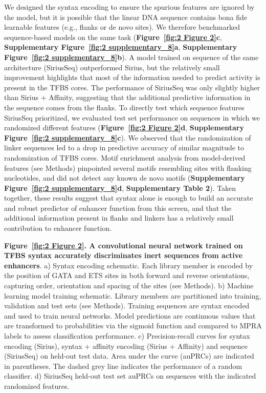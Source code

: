 We designed the syntax encoding to ensure the spurious features are ignored by the model, but it is possible that the linear DNA sequence contains bona fide learnable features (e.g., flanks or de novo sites). We therefore benchmarked sequence-based models on the same task (\textbf{Figure~\ref{fig:2 Figure 2}c}, \textbf{Supplementary Figure~\ref{fig:2 supplementary_8}a}, \textbf{Supplementary Figure~\ref{fig:2 supplementary_8}b})\cite{Ghandi2014-ql}. A model trained on sequence of the same architecture (SiriusSeq) outperformed Sirius, but the relatively small improvement highlights that most of the information needed to predict activity is present in the TFBS cores. The performance of SiriusSeq was only slightly higher than Sirius + Affinity, suggesting that the additional predictive information in the sequence comes from the flanks. To directly test which sequence features SiriusSeq prioritized, we evaluated test set performance on sequences in which we randomized different features (\textbf{Figure~\ref{fig:2 Figure 2}d}, \textbf{Supplementary Figure~\ref{fig:2 supplementary_8}c}). We observed that the randomization of linker sequences led to a drop in predictive accuracy of similar magnitude to randomization of TFBS cores. Motif enrichment analysis from model-derived features (see Methods) pinpointed several motifs resembling sites with flanking nucleotides, and did not detect any known de novo motifs (\textbf{Supplementary Figure~\ref{fig:2 supplementary_8}d}, \textbf{Supplementary Table 2}). Taken together, these results suggest that syntax alone is enough to build an accurate and robust predictor of enhancer function from this screen, and that the additional information present in flanks and linkers has a relatively small contribution to enhancer function.

\clearpage

\thispagestyle{plain}
\noindent
\textbf{Figure~\ref{fig:2 Figure 2}. A convolutional neural network trained on TFBS syntax accurately discriminates inert sequences from active enhancers}. a) Syntax encoding schematic. Each library member is encoded by the position of GATA and ETS sites in both forward and reverse orientations, capturing order, orientation and spacing of the sites (see Methods). b) Machine learning model training schematic. Library members are partitioned into training, validation and test sets (see Methods). Training sequences are syntax encoded and used to train neural networks. Model predictions are continuous values that are transformed to probabilities via the sigmoid function and compared to MPRA labels to assess classification performance. c) Precision-recall curves for syntax encoding (Sirius), syntax + affinity encoding (Sirius + Affinity) and sequence (SiriusSeq) on held-out test data. Area under the curve (auPRCs) are indicated in parentheses. The dashed grey line indicates the performance of a random classifier. d) SiriusSeq held-out test set auPRCs on sequences with the indicated randomized features.

